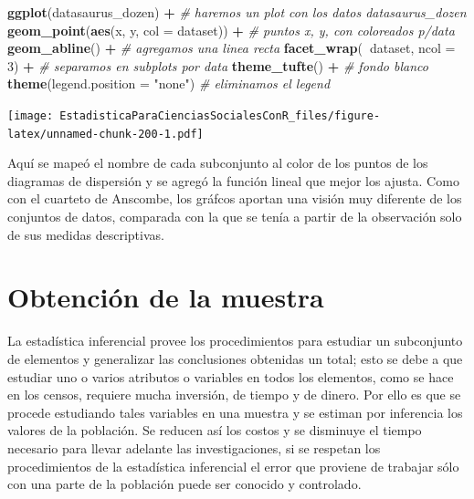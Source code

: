 \documentclass[]{book}
\newenvironment{Shaded}{\begin{snugshade}}{\end{snugshade}}
\newcommand{\CommentTok}[1]{\textcolor[rgb]{0.56,0.35,0.01}{\textit{#1}}}
\newcommand{\DataTypeTok}[1]{\textcolor[rgb]{0.13,0.29,0.53}{#1}}
\newcommand{\DecValTok}[1]{\textcolor[rgb]{0.00,0.00,0.81}{#1}}
\newcommand{\KeywordTok}[1]{\textcolor[rgb]{0.13,0.29,0.53}{\textbf{#1}}}
\newcommand{\NormalTok}[1]{#1}
\newcommand{\OperatorTok}[1]{\textcolor[rgb]{0.81,0.36,0.00}{\textbf{#1}}}
\newcommand{\StringTok}[1]{\textcolor[rgb]{0.31,0.60,0.02}{#1}}
\begin{document}
\begin{Shaded}
\begin{Highlighting}[]
\KeywordTok{ggplot}\NormalTok{(datasaurus_dozen) }\OperatorTok{+}\StringTok{ }\CommentTok{# haremos un plot con los datos datasaurus_dozen}
\StringTok{  }\KeywordTok{geom_point}\NormalTok{(}\KeywordTok{aes}\NormalTok{(x, y, }\DataTypeTok{col =}\NormalTok{ dataset)) }\OperatorTok{+}\StringTok{ }\CommentTok{# puntos x, y, con coloreados p/data}
\StringTok{  }\KeywordTok{geom_abline}\NormalTok{() }\OperatorTok{+}\StringTok{ }\CommentTok{# agregamos una linea recta}
\StringTok{  }\KeywordTok{facet_wrap}\NormalTok{(}\OperatorTok{~}\NormalTok{dataset, }\DataTypeTok{ncol =} \DecValTok{3}\NormalTok{) }\OperatorTok{+}\StringTok{ }\CommentTok{# separamos en subplots por data}
\StringTok{  }\KeywordTok{theme_tufte}\NormalTok{() }\OperatorTok{+}\StringTok{ }\CommentTok{# fondo blanco}
\StringTok{  }\KeywordTok{theme}\NormalTok{(}\DataTypeTok{legend.position =} \StringTok{"none"}\NormalTok{) }\CommentTok{# eliminamos el legend}
\end{Highlighting}
\end{Shaded}

\texttt{[image: EstadisticaParaCienciasSocialesConR\_files/figure-latex/unnamed-chunk-200-1.pdf]}

Aquí se mapeó el nombre de cada subconjunto al color de los puntos de los diagramas de dispersión y se agregó la función lineal que mejor los ajusta.
Como con el cuarteto de Anscombe, los gráfcos aportan una visión muy diferente de los conjuntos de datos, comparada con la que se tenía a partir de la observación solo de sus medidas descriptivas.

\hypertarget{obtenciuxf3n-de-la-muestra}{%
\chapter{Obtención de la muestra}\label{obtenciuxf3n-de-la-muestra}}

La estadística inferencial provee los procedimientos para estudiar un
subconjunto de elementos y generalizar las conclusiones obtenidas un
total; esto se debe a que estudiar uno o varios atributos o variables en
todos los elementos, como se hace en los censos, requiere mucha
inversión, de tiempo y de dinero. Por ello es que se procede estudiando
tales variables en una muestra y se estiman por inferencia los valores
de la población. Se reducen así los costos y se disminuye el tiempo
necesario para llevar adelante las investigaciones, si se respetan los
procedimientos de la estadística inferencial el error que proviene de
trabajar sólo con una parte de la población puede ser conocido y
controlado.
\end{document}
